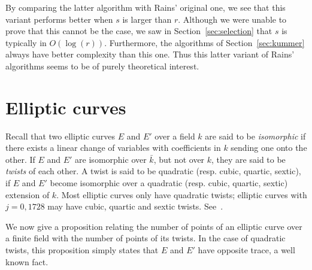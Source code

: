 \documentclass[12pt]{article}
\theoremstyle{plain}
\theoremstyle{definition}
\newcommand{\todo}[1]{\textcolor{red}{TODO: #1}}
\DeclareMathOperator{\Aut}{Aut}
\def\F{\ensuremath{\mathbb{F}}}
\newcounter{algorithm}
\begin{document}
By comparing the latter algorithm with Rains' original one, we see
that this variant performs better when $s$ is larger than $r$. %
Although we were unable to prove that this cannot be the case, we saw
in Section~\ref{sec:selection} that $s$ is typically in
$O(\log(r))$. %
Furthermore, the algorithms of Section~\ref{sec:kummer} always have
better complexity than this one. %
Thus this latter variant of Rains' algorithms seems to be of purely
theoretical interest.



\section{Elliptic curves}
\label{app:elliptic-curves}




Recall that two elliptic curves $E$ and $E'$ over a field $k$ are said
to be \emph{isomorphic} if there exists a linear change of variables
with coefficients in $k$ sending one onto the other. If $E$ and $E'$
are isomorphic over $\bar{k}$, but not over $k$, they are said to be
\emph{twists} of each other. A twist is said to be quadratic
(resp. cubic, quartic, sextic), if $E$ and $E'$ become isomorphic over
a quadratic (resp. cubic, quartic, sextic) extension of $k$. Most
elliptic curves only have quadratic twists; elliptic curves with
$j=0,1728$ may have cubic, quartic and sextic twists. See~\cite{Sil}.

We now give a proposition relating the number of points of an elliptic
curve over a finite field with the number of points of its twists.  In
the case of quadratic twists, this proposition simply states that $E$
and $E'$ have opposite trace, a well known fact.
\end{document}
